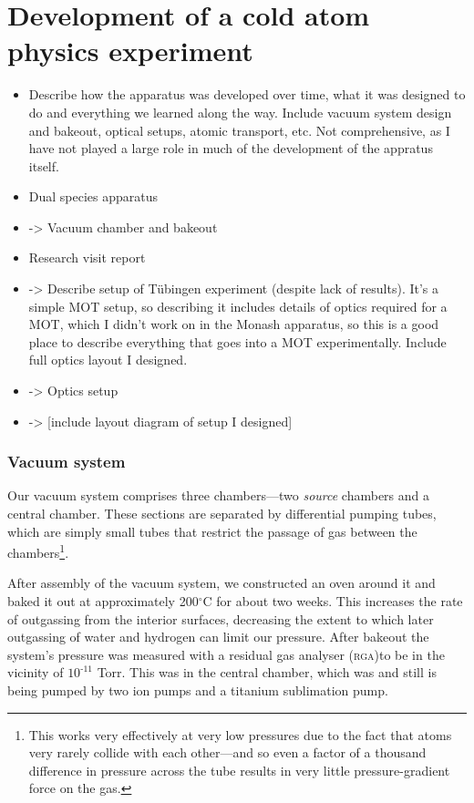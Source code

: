 
\chapter{Development of a cold atom physics experiment}\label{chap:experiment}
\begin{itemize}
\item Describe how the apparatus was developed over time, what it was designed to do and everything we learned along the way. Include vacuum system design and bakeout, optical setups, atomic transport, etc. Not comprehensive, as I have not played a large role in much of the development of the appratus itself.

\item Dual species apparatus
\item -> Vacuum chamber and bakeout
\item Research visit report
\item ->
    Describe setup of Tübingen experiment (despite lack of results). It's a simple MOT setup, so describing it includes details of optics required for a MOT, which I didn't work on in the Monash apparatus, so this is a good place to describe everything that goes into a MOT experimentally. Include full optics layout I designed.
    \item -> Optics setup
    \item -> [include layout diagram of setup I designed]
\end{itemize}

\subsection{Vacuum system}
Our vacuum system comprises three chambers---two \emph{source} chambers and a central chamber. These sections are separated by differential pumping tubes, which are simply small tubes that restrict the passage of gas between the chambers\footnote{This works very effectively at very low pressures due to the fact that atoms very rarely collide with each other---and so even a factor of a thousand difference in pressure across the tube results in very little pressure-gradient force on the gas.}.

After assembly of the vacuum system, we constructed an oven around it and baked it out at approximately 200$^\circ$C for about two weeks. This increases the rate of outgassing from the interior surfaces, decreasing the extent to which later outgassing of water and hydrogen can limit our pressure. After bakeout the system's pressure was measured with a residual gas analyser (\textsc{rga})to be in the vicinity of $10^{\textrm{{-11}}}$ Torr. This was in the central chamber, which was and still is being pumped by two ion pumps and a titanium sublimation pump.

